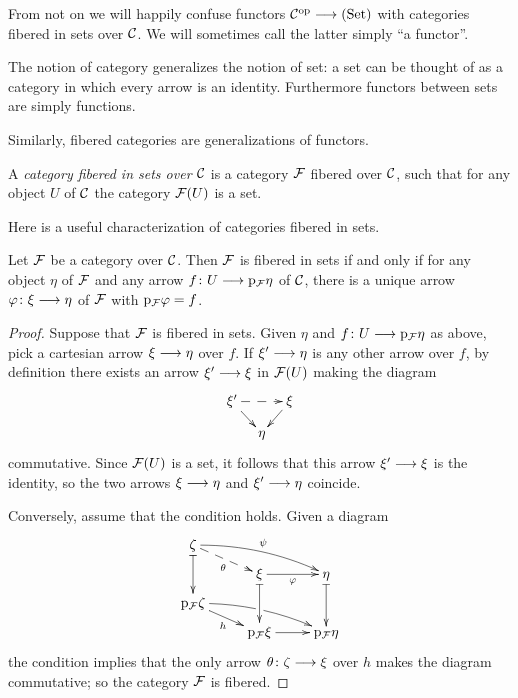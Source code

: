 \begin{3   FIBERED CATEGORIES}
\begin{3.4 Functors and cats fibered in sets}
\begin{shaded}
From not on we will happily confuse functors $\mathcal{C}^{\mathrm{op}}\longrightarrow(\mathrm{Set})$ with categories fibered in sets over $\mathcal{C}$. We will sometimes call the latter simply ``a functor''.
\end{shaded}

The notion of category generalizes the notion of set: a set can be thought of as a category in which every arrow is an identity. Furthermore functors between sets are simply functions.

Similarly, fibered categories are generalizations of functors.

\begin{definition} A \emph{category fibered in sets over $\mathcal{C}$}%
%
 is a category $\mathcal{F}$ fibered over $\mathcal{C}$, such that for any object $U$ of $\mathcal{C}$ the category $\mathcal{F}(U)$ is a set.
\end{definition}

Here is a useful characterization of categories fibered in sets.

\begin{proposition}%
\label{prop:characterization-fibered-sets}
Let $\mathcal{F}$ be a category over $\mathcal{C}$. Then $\mathcal{F}$ is fibered in sets if and only if for any object $\eta$ of $\mathcal{F}$ and any arrow $f \colon U \arr  \p_{\cF} \eta$ of $\mathcal{C}$, there is a unique arrow $\phi\colon \xi \arr \eta$ of $\mathcal{F}$ with $\mathrm{p}_{\mathcal{F}} \varphi = f$.
\end{proposition}

\begin{proof} Suppose that $\mathcal{F}$ is fibered in sets. Given $\eta$ and $f \colon U \arr \p_{\cF} \eta$ as above, pick a cartesian arrow $\xi \arr \eta$ over $f$. If $\xi' \arr \eta$ is any other arrow over $f$, by definition there exists an arrow $\xi' \arr \xi$ in $\mathcal{F}(U)$ making the diagram 
   \[
   \xymatrix@-15pt{{}\xi' \ar@{-->}[rr]\ar[rd] && {}\xi\ar[ld]\\
             & {}\eta \\}
   \]
commutative. Since $\mathcal{F}(U)$ is a set, it follows that this arrow $\xi' \arr \xi$ is the identity, so the two arrows $\xi\arr \eta$ and $\xi' \arr \eta$ coincide.

Conversely, assume that the condition holds. Given a diagram
   \[
   \xymatrix@R=6pt{{\zeta}\ar@{|->}[dd] \ar@{-->}[rd]_\theta
   \ar@/^/[rrd]^{\psi} \\
   & {}\xi\ar@{|->}[dd]\ar[r]_{\phi}
   &{}\eta\ar@{|->}[dd] \\
   {}\p_{\cF} \zeta\ar[rd]_h\ar@/^/[rrd]|(.487)\hole\\
   & {}\p_{\cF} \xi \ar[r]
   & {}\p_{\cF} \eta
   }
   \]
the condition implies that the only arrow $\theta\colon \zeta \arr \xi$ over $h$ makes the diagram commutative; so the category $\mathcal{F}$ is fibered.


\end{proof}
\end{3.4 Functors and cats fibered in sets}
\end{3   FIBERED CATEGORIES}
